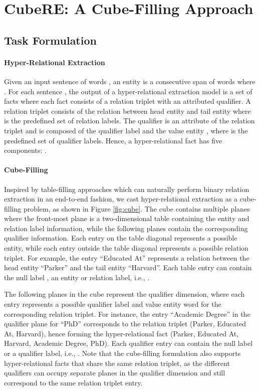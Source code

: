\documentclass[11pt]{article}
\newcommand{\modelname}{CubeRE}
\begin{document}
\section{{\modelname{}: A Cube-Filling Approach}}

\subsection{Task Formulation}
\paragraph{Hyper-Relational Extraction}
Given an input sentence of  words , an entity  is a consecutive span of words where .
For each sentence , the output of a hyper-relational extraction model is a set of facts where each fact consists of a relation triplet with an attributed qualifier.
A relation triplet consists of the relation  between head entity  and tail entity  where  is the predefined set of relation labels. 
The qualifier is an attribute of the relation triplet and is composed of the qualifier label  and the value entity , where  is the predefined set of qualifier labels.
Hence, a hyper-relational fact has five components: .

\paragraph{Cube-Filling}
Inspired by table-filling approaches which can naturally perform binary relation extraction in an end-to-end fashion, we cast hyper-relational extraction as a cube-filling problem, as shown in Figure \ref{fig:cube}.
The cube contains multiple planes where the front-most plane is a two-dimensional table 
containing the entity and relation label information, while the following planes contain the corresponding qualifier information.
Each entry on the table diagonal represents a possible entity, while each entry outside the table diagonal represents a possible relation triplet.
For example, the entry ``Educated At'' represents a relation between the head entity ``Parker'' and the tail entity ``Harvard''.
Each table entry  can contain the null label , an entity or relation label, i.e., .

The following planes in the cube represent the qualifier dimension, where each entry represents a possible qualifier label and value entity word for the corresponding relation triplet.
For instance, the entry ``Academic Degree'' in the qualifier plane for ``PhD'' corresponds to the relation triplet (Parker, Educated At, Harvard), hence forming the hyper-relational fact (Parker, Educated At, Harvard, Academic Degree, PhD).
Each qualifier entry  can contain the null label  or a qualifier label, i.e., .
Note that the cube-filling formulation also supports hyper-relational facts that share the same relation triplet, as the different qualifiers can occupy separate planes in the qualifier dimension and still correspond to the same relation triplet entry.
\end{document}
